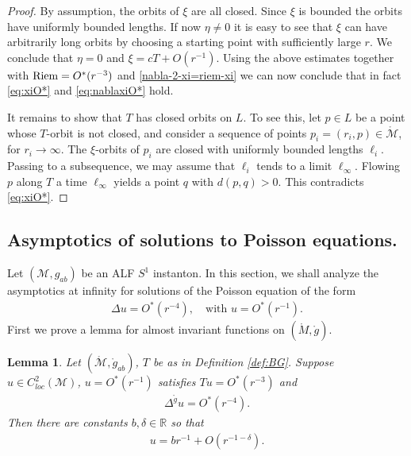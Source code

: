 \documentclass[a4paper,11pt,reqno]{amsart}
\newcommand{\Reals}{\mathbb{R}}
\newcommand{\Riem}{\mathop{\rm Riem}}
\newcommand{\cM}{\mathcal{M}}
\theoremstyle{plain}
\newtheorem{lemma}[thm]{Lemma}
\newcommand{\Mring}{\mathring{M}}
\newcommand{\gring}{\mathring{g}}
\numberwithin{equation}{section}
\begin{document}
\begin{proof}
By assumption, the orbits of $\xi$ are all closed. Since $\xi$ is bounded the orbits have uniformly bounded lengths. If now $\eta\neq 0$ it is easy to see that $\xi$ can have arbitrarily long orbits by choosing a starting point with sufficiently large $r$. We conclude that $\eta=0$ and $\xi = cT + O(r^{-1})$. 
Using the above estimates together with $\Riem = O^*(r^{-3})$ and \eqref{nabla-2-xi=riem-xi} we can now conclude that in fact \eqref{eq:xiO*} and \eqref{eq:nablaxiO*} hold. 

It remains to show that $T$ has closed orbits on $L$. To see this, let $p \in L$ be a point whose $T$-orbit is not closed, and consider a sequence of points $p_i = (r_i, p) \in \mathring{\cM}$, for $r_i \to \infty$. The $\xi$-orbits of $p_i$ are closed with uniformly bounded lengths $\ell_i$. Passing to a subsequence, we may assume that $\ell_i$ tends to a limit $\ell_\infty$. Flowing $p$ along $T$ a time $\ell_\infty$ yields a point $q$ with $d(p, q) > 0$. This contradicts \eqref{eq:xiO*}. 
\end{proof}

\subsection{Asymptotics of solutions to Poisson equations.} \label{sec:asympPoi}  
Let $(\cM, g_{ab})$ be an ALF $S^1$ instanton. In this section, we shall analyze the asymptotics at infinity for solutions of the Poisson equation of the form 
\begin{align} 
\Delta u = O^*(r^{-4}), \quad \text{with $u = O^*(r^{-1})$}.
\end{align} 
First we prove a lemma for almost invariant functions on $(\Mring,\gring)$.  

\begin{lemma} \label{lemma-poisson-gring} 
Let $(\mathring{\cM}, \mathring{g}_{ab})$, $T$ be as in Definition \ref{def:BG}. Suppose $u \in C^2_{loc}(\cM)$, $u = O^*(r^{-1})$ satisfies $Tu = O^*(r^{-3})$ and 
\begin{align}\label{eq:Pois*} 
\Delta^{\gring}u = O^*(r^{-4}).
\end{align}
Then there are constants $b, \delta \in \Reals$ so that 
\begin{align} 
u = br^{-1} + O(r^{-1-\delta}).
\end{align} 
\end{lemma}
\end{document}
